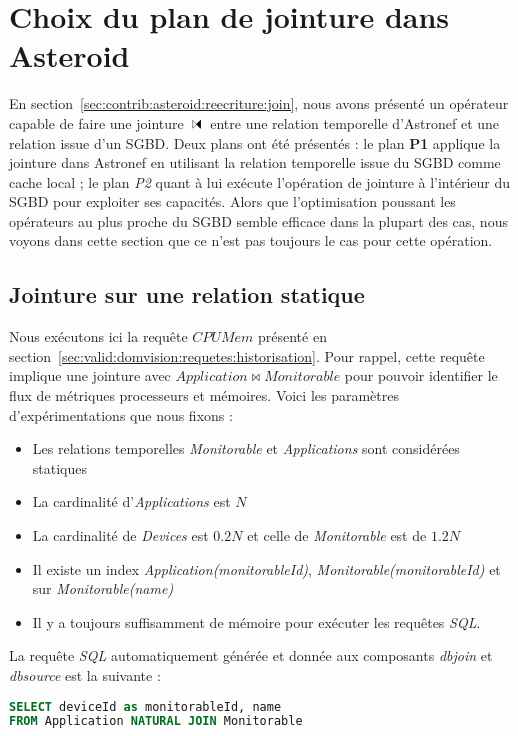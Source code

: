 \section{Choix du plan de jointure dans Asteroid}\label{sec:valid:perfs:couplage}
En section~\ref{sec:contrib:asteroid:reecriture:join}, nous avons présenté un opérateur capable de faire une jointure $\ssjoin$ entre une relation temporelle d'Astronef et une relation issue d'un SGBD. Deux plans ont été présentés : le plan \textbf{P1} applique la jointure dans Astronef en utilisant la relation temporelle issue du SGBD comme cache local ; le plan \textit{P2} quant à lui exécute l'opération de jointure à l'intérieur du SGBD pour exploiter ses capacités. Alors que l'optimisation poussant les opérateurs au plus proche du SGBD semble efficace dans la plupart des cas, nous voyons dans cette section que ce n'est pas toujours le cas pour cette opération.

\subsection{Jointure sur une relation statique}
Nous exécutons ici la requête $CPUMem$ présenté en section~\ref{sec:valid:domvision:requetes:historisation}. Pour rappel, cette requête implique une jointure avec $Application \Join Monitorable$ pour pouvoir identifier le flux de métriques processeurs et mémoires. Voici les paramètres d'expérimentations que nous fixons :
\begin{itemize}
	\item Les relations temporelles \textit{Monitorable} et \textit{Applications} sont considérées statiques
	\item La cardinalité d'\textit{Applications} est $N$
	\item La cardinalité de \textit{Devices} est $0.2N$ et celle de \textit{Monitorable} est de $1.2N$
	\item Il existe un index \textit{Application(monitorableId)}, \textit{Monitorable(monitorableId)} et sur \textit{Monitorable(name)}
	\item Il y a toujours suffisamment de mémoire pour exécuter les requêtes \textit{SQL}.
\end{itemize}

La requête \textit{SQL} automatiquement générée et donnée aux composants \textit{dbjoin} et \textit{dbsource} est la suivante :
\begin{lstlisting}[language=SQL]
SELECT deviceId as monitorableId, name 
FROM Application NATURAL JOIN Monitorable
\end{lstlisting}

